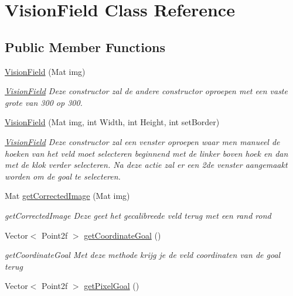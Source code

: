 \hypertarget{class_vision_field}{\section{Vision\-Field Class Reference}
\label{class_vision_field}
}
\subsection*{Public Member Functions}
\begin{DoxyCompactItemize}
\item 
\hyperlink{class_vision_field_a63ac893a76b9935510e9e81521a98a03}{Vision\-Field} (Mat img)
\begin{DoxyCompactList}\small\item\em \hyperlink{class_vision_field}{Vision\-Field} Deze constructor zal de andere constructor oproepen met een vaste grote van 300 op 300. \end{DoxyCompactList}\item 
\hyperlink{class_vision_field_a298ad19389c5e2259260733f5886e3a8}{Vision\-Field} (Mat img, int Width, int Height, int set\-Border)
\begin{DoxyCompactList}\small\item\em \hyperlink{class_vision_field}{Vision\-Field} Deze constructor zal een venster oproepen waar men manueel de hoeken van het veld moet selecteren beginnend met de linker boven hoek en dan met de klok verder selecteren. Na deze actie zal er een 2de venster aangemaakt worden om de goal te selecteren. \end{DoxyCompactList}\item 
Mat \hyperlink{class_vision_field_aaf45a01e9318061caf6128e025b2df53}{get\-Corrected\-Image} (Mat img)
\begin{DoxyCompactList}\small\item\em get\-Corrected\-Image Deze geet het gecalibreede veld terug met een rand rond \end{DoxyCompactList}\item 
Vector$<$ Point2f $>$ \hyperlink{class_vision_field_a5e900f3e313c469faac7d2111d7d7905}{get\-Coordinate\-Goal} ()
\begin{DoxyCompactList}\small\item\em get\-Coordinate\-Goal Met deze methode krijg je de veld coordinaten van de goal terug \end{DoxyCompactList}\item 
Vector$<$ Point2f $>$ \hyperlink{class_vision_field_a8d7562253b4e3d48abf9cdcded32c20a}{get\-Pixel\-Goal} ()

\end{DoxyCompactItemize}
